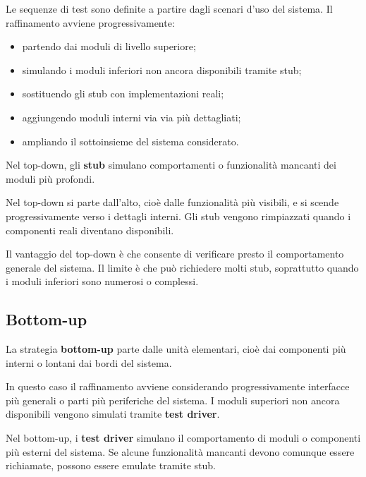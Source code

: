 Le sequenze di test sono definite a partire dagli scenari d'uso del sistema. Il raffinamento avviene progressivamente:

\begin{itemize}
    \item partendo dai moduli di livello superiore;
    \item simulando i moduli inferiori non ancora disponibili tramite stub;
    \item sostituendo gli stub con implementazioni reali;
    \item aggiungendo moduli interni via via più dettagliati;
    \item ampliando il sottoinsieme del sistema considerato.
\end{itemize}

\begin{notaslide}
Nel top-down, gli \textbf{stub} simulano comportamenti o funzionalità mancanti dei moduli più profondi.
\end{notaslide}

\begin{notaprof}
Nel top-down si parte dall'alto, cioè dalle funzionalità più visibili, e si scende progressivamente verso i dettagli interni. Gli stub vengono rimpiazzati quando i componenti reali diventano disponibili.
\end{notaprof}

Il vantaggio del top-down è che consente di verificare presto il comportamento generale del sistema. Il limite è che può richiedere molti stub, soprattutto quando i moduli inferiori sono numerosi o complessi.

\subsection{Bottom-up}

La strategia \textbf{bottom-up} parte dalle unità elementari, cioè dai componenti più interni o lontani dai bordi del sistema.

In questo caso il raffinamento avviene considerando progressivamente interfacce più generali o parti più periferiche del sistema. I moduli superiori non ancora disponibili vengono simulati tramite \textbf{test driver}.

\begin{notaslide}
Nel bottom-up, i \textbf{test driver} simulano il comportamento di moduli o componenti più esterni del sistema. Se alcune funzionalità mancanti devono comunque essere richiamate, possono essere emulate tramite stub.
\end{notaslide}

